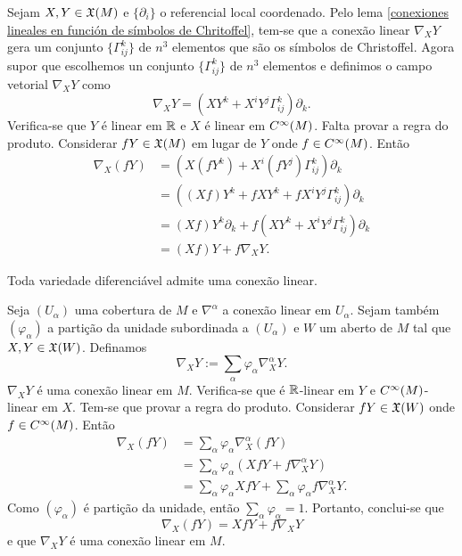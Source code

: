 \begin{demonstracao}
	Sejam $X,Y \in \mathfrak{X}(M)$ e $\{ \partial_i \}$ o referencial local coordenado. Pelo lema \ref{conexiones lineales en función de símbolos de Chritoffel}, tem-se que a conexão linear $\nabla_X Y$ gera um conjunto $\{ \Gamma_{ij}^k \}$ de $n^3$ elementos que são os símbolos de Christoffel. Agora supor que escolhemos un conjunto $\{ \Gamma_{ij}^k \} $ de $n^3$ elementos e definimos o campo vetorial $\nabla_X Y$ como
	\begin{equation*}
		\nabla_X Y = (X Y^k + X^i Y^j \Gamma_{ij}^k) \partial_k.
	\end{equation*}
	Verifica-se que $Y$ é linear em $\mathbb{R}$ e $X$ é linear em $C^\infty(M)$. Falta provar a regra do produto. Considerar $fY \in \mathfrak{X}(M)$ em lugar de $Y$ onde $f \in C^\infty(M)$. Então
	\begin{align*}
		\nabla_X (fY) &= (X(f Y^k) + X^i (f Y^j) \Gamma_{ij}^k) \partial_k\\
		&= ( (Xf) Y^k + f X Y^k + f X^i Y^j \Gamma_{ij}^k ) \partial_k\\
		&= (Xf) Y^k \partial_k + f (X Y^k + X^i Y^j \Gamma_{ij}^k) \partial_k\\
		&= (Xf) Y + f \nabla_X Y.
	\end{align*}
\end{demonstracao}

\begin{proposicao}
	Toda variedade diferenciável admite uma conexão linear.
\end{proposicao}

\begin{demonstracao}
	Seja $(U_{\alpha})$ uma cobertura de $M$ e $\nabla^{\alpha}$ a conexão linear em $U_{\alpha}$. Sejam também $(\varphi_{\alpha})$ a partição da unidade subordinada a $(U_{\alpha})$ e $W$ um aberto de $M$ tal que $X,Y \in \mathfrak{X}(W)$. Definamos
	\begin{equation*}
		\nabla_X Y := \sum_{\alpha} \varphi_{\alpha} \nabla_X^{\alpha} Y.
	\end{equation*}
	$\nabla_X Y$ é uma conexão linear em $M$. Verifica-se que é $\mathbb{R}$-linear em $Y$ e $C^\infty(M)$-linear em $X$. Tem-se que provar a regra do produto. Considerar $fY \in \mathfrak{X}(W)$ onde $f \in C^\infty(M)$. Então
	\begin{align*}
		\nabla_X (fY) &= \sum_{\alpha} \varphi_{\alpha} \nabla_X^{\alpha} (fY)\\
		&= \sum_{\alpha} \varphi_{\alpha} (Xf Y + f \nabla_X^{\alpha} Y)\\
		&= \sum_{\alpha} \varphi_{\alpha} X f Y + \sum_{\alpha} \varphi_{\alpha} f \nabla_X^{\alpha} Y. 
	\end{align*}
	Como $(\varphi_{\alpha})$ é partição da unidade, então $\sum_{\alpha} \varphi_{\alpha} = 1$. Portanto, conclui-se que
	\begin{equation*}
		\nabla_X (fY) = X f Y + f \nabla_X Y
	\end{equation*}
	e que $\nabla_X Y$ é uma conexão linear em $M$.
\end{demonstracao}

